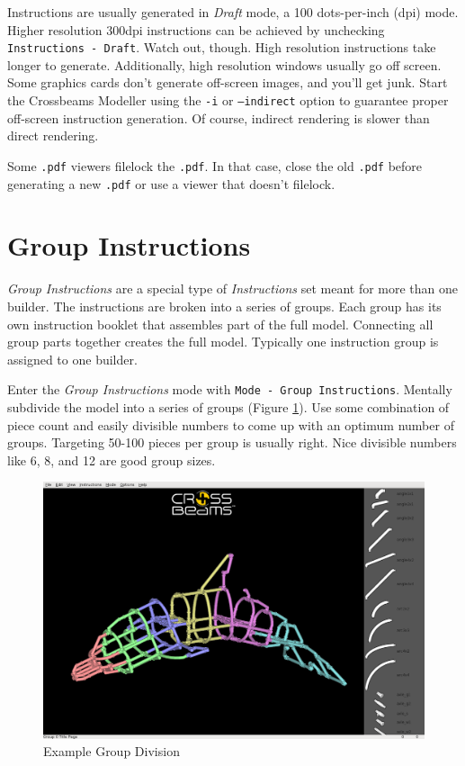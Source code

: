 \documentclass[12pt]{report}
\begin{document}
Instructions are usually generated in \emph{Draft} mode, a 100
dots-per-inch (dpi) mode.  Higher resolution 300dpi instructions can
be achieved by unchecking {\tt Instructions - Draft}.  Watch out,
though.  High resolution instructions take longer to generate.
Additionally, high resolution windows usually go off screen.  Some
graphics cards don't generate off-screen images, and you'll get junk.
Start the Crossbeams Modeller using the {\tt -i} or {\tt --indirect}
option to guarantee proper off-screen instruction generation.  Of
course, indirect rendering is slower than direct rendering.

Some {\tt .pdf} viewers filelock the {\tt .pdf}.  In that case, close
the old {\tt .pdf} before generating a new {\tt .pdf} or use a viewer
that doesn't filelock.

\section{Group Instructions}

\emph{Group Instructions} are a special type of \emph{Instructions}
set meant for more than one builder.  The instructions are broken into a series of groups.  Each group has its own instruction booklet that assembles part of the full model.  Connecting all group parts together creates the full model.  Typically one instruction group is assigned to one builder.

Enter the \emph{Group Instructions} mode with {\tt Mode - Group
  Instructions}.  Mentally subdivide the model into a series of groups
(Figure \ref{GroupDivision}).  Use some combination of piece count and
easily divisible numbers to come up with an optimum number of groups.
Targeting 50-100 pieces per group is usually right.  Nice divisible
numbers like 6, 8, and 12 are good group sizes.

\begin{figure}[h]
\begin{center}
\includegraphics[width=6.38in]{doc_images/manual_group_select.png}
\caption{Example Group Division}
\label{GroupDivision}
\end{center}
\end{figure}
\end{document}
